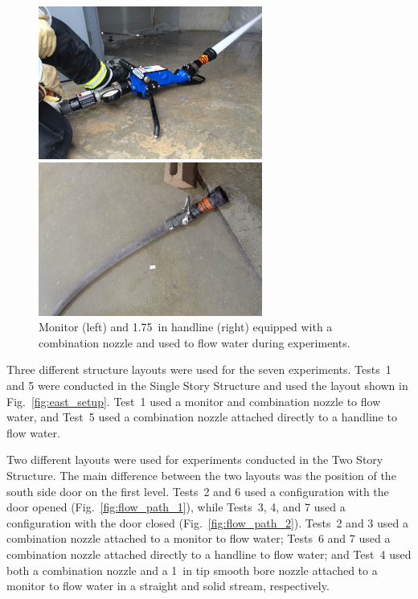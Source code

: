 \documentclass[12pt,oneside]{book}
\begin{document}
\begin{figure}[!ht]
	\minipage{3in}
	\begin{center}
		\includegraphics[width=2.9in]{../Figures/Pictures/monitor}
	\end{center} 
	\endminipage \hfill
	\minipage{3in}
	\begin{center}
		\includegraphics[width=2.9in]{../Figures/Pictures/handline}
	\end{center}
	\endminipage \hfill
	\caption[Monitor and handline equipped with a combination nozzle.]{Monitor (left) and 1.75~in handline (right) equipped with a combination nozzle and used to flow water during experiments.}
	\label{fig:monitor+handline}
\end{figure}
\FloatBarrier

Three different structure layouts were used for the seven experiments. Tests~1 and 5 were conducted in the Single Story Structure and used the layout shown in Fig.~\ref{fig:east_setup}. Test~1 used a monitor and combination nozzle to flow water, and Test~5 used a combination nozzle attached directly to a handline to flow water.

Two different layouts were used for experiments conducted in the Two Story Structure. The main difference between the two layouts was the position of the south side door on the first level. Tests~2 and 6 used a configuration with the door opened (Fig.~\ref{fig:flow_path_1}), while Tests~3, 4, and 7 used a configuration with the door closed (Fig.~\ref{fig:flow_path_2}). Tests~2 and 3 used a combination nozzle attached to a monitor to flow water; Tests~6 and 7 used a combination nozzle attached directly to a handline to flow water; and Test~4 used both a combination nozzle and a 1~in tip smooth bore nozzle attached to a monitor to flow water in a straight and solid stream, respectively. 
\end{document}

